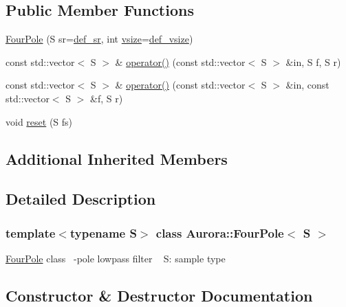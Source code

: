 \subsection*{Public Member Functions}
\begin{DoxyCompactItemize}
\item 
\hyperlink{class_aurora_1_1_four_pole_acd6f1e5b94bdc248e8e955f4ef8f7dcc}{Four\+Pole} (S sr=\hyperlink{namespace_aurora_ad49263d809bea98dd422e95bc91bc03e}{def\+\_\+sr}, int \hyperlink{class_aurora_1_1_snd_base_af9e21aaf411b17f7a8221c991ce5d291}{vsize}=\hyperlink{namespace_aurora_afaaddf667a06e7ce23c667a8b7295263}{def\+\_\+vsize})
\item 
const std\+::vector$<$ S $>$ \& \hyperlink{class_aurora_1_1_four_pole_ac3cfee8b5d8f0bf8d0b0c6784eb81fef}{operator()} (const std\+::vector$<$ S $>$ \&in, S f, S r)
\item 
const std\+::vector$<$ S $>$ \& \hyperlink{class_aurora_1_1_four_pole_a300ec87b54b5e8c5c76c1005fe31c9d9}{operator()} (const std\+::vector$<$ S $>$ \&in, const std\+::vector$<$ S $>$ \&f, S r)
\item 
void \hyperlink{class_aurora_1_1_four_pole_a5de080ccd74617a6bfba13d3d76bcb4b}{reset} (S fs)
\end{DoxyCompactItemize}
\subsection*{Additional Inherited Members}


\subsection{Detailed Description}
\subsubsection*{template$<$typename S$>$\newline
class Aurora\+::\+Four\+Pole$<$ S $>$}

\hyperlink{class_aurora_1_1_four_pole}{Four\+Pole} class ~-\/pole lowpass filter ~\newline
S\+: sample type 

\subsection{Constructor \& Destructor Documentation}
\mbox{\label{class_aurora_1_1_four_pole_acd6f1e5b94bdc248e8e955f4ef8f7dcc}} 
